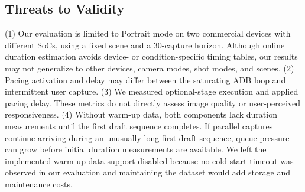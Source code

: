 \subsection{Threats to Validity}
\label{sec:threats}

(1) Our evaluation is limited to Portrait mode on two commercial devices with different SoCs, using a fixed scene and a 30-capture horizon.
Although online duration estimation avoids device- or condition-specific timing tables, our results may not generalize to other devices, camera modes, shot modes, and scenes.
(2) Pacing activation and delay may differ between the saturating ADB loop and intermittent user capture.
(3) We measured optional-stage execution and applied pacing delay.
These metrics do not directly assess image quality or user-perceived responsiveness.
(4) Without warm-up data, both components lack duration measurements until the first draft sequence completes.
If parallel captures continue arriving during an unusually long first draft sequence, queue pressure can grow before initial duration measurements are available.
We left the implemented warm-up data support disabled because no cold-start timeout was observed in our evaluation and maintaining the dataset would add storage and maintenance costs.
